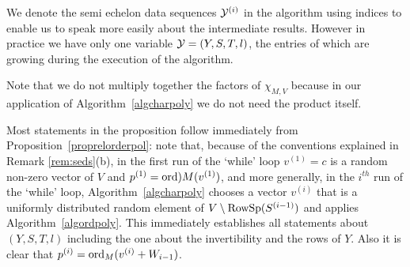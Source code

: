\begin{Rem}
We denote the semi echelon data sequences 
$\mathcal{Y}^{(i)}$ in the algorithm using indices to enable us to speak 
more easily about the intermediate results. However in practice
we have only one variable $\mathcal{Y}=(Y,S,T,l)$, the entries of which are 
growing during the execution of the algorithm.
\end{Rem}


\begin{Rem}
Note that we do not multiply together the factors of 
$\chi_{M,V}$ because in our application of Algorithm~\ref{algcharpoly} 
we do not need the product itself.
\end{Rem}

Most statements in the proposition follow immediately from 
Proposition~\ref{proprelorderpol}: note that, because of the conventions
explained in Remark \ref{rem:seds}(b), in the first run of the
`while' loop $v^{(1)}=c$ is a random non-zero vector of $V$ and
$p^{(1)}=\mathrm{ord})M(v^{(1)})$, and more generally,
in the $i^{th}$ run of the 
`while' loop, Algorithm~\ref{algcharpoly}
chooses a  vector $v^{(i)}$ that is a uniformly distributed random element 
of $V\setminus \mathrm{RowSp}(S^{(i-1)})$
and applies Algorithm~\ref{algordpoly}.
This immediately establishes all statements about
$(Y,S,T,l)$ including the one about the invertibility and the
rows of $Y$. Also it is clear that $p^{(i)} = \mathrm{ord}_M(v^{(i)} + W_{i-1})$.

